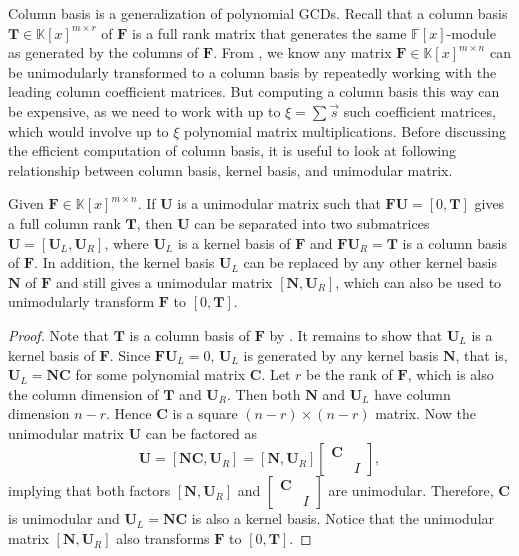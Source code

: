 Column basis is a generalization of polynomial GCDs. Recall that a
column basis $\mathbf{T}\in\mathbb{K}\left[x\right]^{m\times r}$
of $\mathbf{F}$ is a full rank matrix that generates the same $\mathbb{F}\left[x\right]$-module
as generated by the columns of $\mathbf{F}$. From ,
we know any matrix $\mathbf{F}\in\mathbb{K}\left[x\right]^{m\times n}$
can be unimodularly transformed to a column basis by repeatedly working
with the leading column coefficient matrices. But computing a column
basis this way can be expensive, as we need to work with up to $\xi=\sum\vec{s}$
such coefficient matrices, which would involve up to $\xi$ polynomial
matrix multiplications.  Before discussing the efficient computation
of column basis, it is useful to look at following relationship between
column basis, kernel basis, and unimodular matrix.
\begin{lem}
\label{lem:unimodular_kernel_columnBasis}Given $\mathbf{F}\in\mathbb{K}\left[x\right]^{m\times n}$.
If $\mathbf{U}$ is a unimodular matrix such that $\mathbf{F}\mathbf{U}=\left[0,\mathbf{T}\right]$
gives a full column rank $\mathbf{T}$, then $\mathbf{U}$ can be
separated into two submatrices $\mathbf{U}=\left[\mathbf{U}_{L},\mathbf{U}_{R}\right]$,
where $\mathbf{U}_{L}$ is a kernel basis of $\mathbf{F}$ and $\mathbf{F}\mathbf{U}_{R}=\mathbf{T}$
is a column basis of $\mathbf{F}$. In addition, the kernel basis
$\mathbf{U}_{L}$ can be replaced by any other kernel basis $\mathbf{N}$
of $\mathbf{F}$ and still gives a unimodular matrix $\left[\mathbf{N},\mathbf{U}_{R}\right]$,
which can also be used to unimodularly transform $\mathbf{F}$ to
$\left[0,\mathbf{T}\right]$. \end{lem}
\begin{proof}
Note that $\mathbf{T}$ is a column basis of $\mathbf{F}$ by .
It remains to show that $\mathbf{U}_{L}$ is a kernel basis of $\mathbf{F}$.
Since $\mathbf{F}\mathbf{U}_{L}=0$, $\mathbf{U}_{L}$ is generated
by any kernel basis $\mathbf{N}$, that is, $\mathbf{U}_{L}=\mathbf{N}\mathbf{C}$
for some polynomial matrix $\mathbf{C}$. Let $r$ be the rank of
$\mathbf{F}$, which is also the column dimension of $\mathbf{T}$
and $\mathbf{U}_{R}$. Then both $\mathbf{N}$ and $\mathbf{U}_{L}$
have column dimension $n-r$. Hence $\mathbf{C}$ is a square $(n-r)\times(n-r)$
matrix. Now the unimodular matrix $\mathbf{U}$ can be factored as
\[
\mathbf{U}=\left[\mathbf{N}\mathbf{C},\mathbf{U}_{R}\right]=\left[\mathbf{N},\mathbf{U}_{R}\right]\begin{bmatrix}\mathbf{C}\\
 & I
\end{bmatrix},
\]
 implying that both factors $\left[\mathbf{N},\mathbf{U}_{R}\right]$
and $\begin{bmatrix}\mathbf{C}\\
 & I
\end{bmatrix}$ are unimodular. Therefore, $\mathbf{C}$ is unimodular and $\mathbf{U}_{L}=\mathbf{N}\mathbf{C}$
is also a kernel basis. Notice that the unimodular matrix $\left[\mathbf{N},\mathbf{U}_{R}\right]$
also transforms $\mathbf{F}$ to $\left[0,\mathbf{T}\right]$.
\end{proof}
